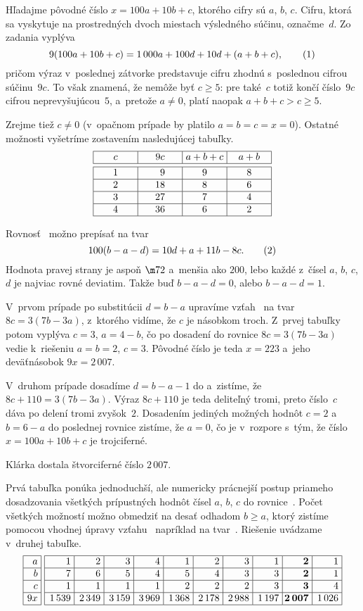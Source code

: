 {%
Hľadajme pôvodné číslo $x=100a+10b+c$, ktorého cifry sú $a$, $b$, $c$.
Cifru, ktorá sa vyskytuje na prostredných dvoch miestach výsledného súčinu,
označme~$d$. Zo zadania vyplýva
$$
9(100a+10b+c)=1\,000a+100d+10d+(a+b+c),    \tag1
$$
pričom výraz v~poslednej zátvorke predstavuje cifru zhodnú s~poslednou
cifrou súčinu~$9c$. To však znamená, že nemôže byť $c\ge5$: pre také~$c$
totiž končí číslo~$9c$ cifrou neprevyšujúcou~$5$, a~pretože $a\ne0$, platí
naopak $a+b+c>c\ge5$.

Zrejme tiež $c\ne0$ (v~opačnom prípade by platilo $a=b=c=x=0$). Ostatné
možnosti vyšetríme zostavením nasledujúcej tabuľky.
$$
\vbox{\offinterlineskip\everycr{\noalign{\hrule}}
 \catcode`@\active\def@{\phantom0}
 \halign{\strut\vrule#&&\hbox to 4.5em{\hss$#$\hss}\vrule\cr
&c   &9c &a+b+c& a+b\cr \noalign{\vskip3pt\hrule}
&1   &@9 & 9   &8\cr
&2   &18 & 8   &6\cr
&3   &27 & 7   &4\cr
&4   &36 & 6   &2\cr
}}
$$

Rovnosť~ možno prepísať na tvar
$$
100(b-a-d)=10d+a+11b-8c.          \tag2
$$
Hodnota pravej strany je aspoň $\m72$ a~menšia ako $200$, lebo každé z~čísel $a$,
$b$, $c$, $d$ je najviac rovné deviatim. Takže buď $b-a-d=0$, alebo $b-a-d=1$.

V~prvom prípade po substitúcii $d=b-a$ upravíme vzťah~ na tvar $8c=3(7b-3a)$,
z~ktorého vidíme, že $c$ je násobkom troch. Z~prvej tabuľky potom vyplýva $c=3$, $a=4-b$,
čo po dosadení do rovnice $8c=3(7b-3a)$ vedie k~riešeniu $a=b=2$, $c=3$.
Pôvodné číslo je teda $x=223$ a~jeho deväťnásobok $9x=2\,007$.

V~druhom prípade dosadíme $d=b-a-1$ do  a~zistíme, že $8c+110=3(7b-3a)$.
Výraz $8c+110$ je teda deliteľný tromi, preto číslo~$c$ dáva po delení
tromi zvyšok~$2$. Dosadením jediných možných hodnôt $c=2$ a~$b=6-a$ do poslednej
rovnice zistíme, že $a=0$, čo je v~rozpore s~tým, že číslo $x=100a+10b+c$ je
trojciferné.

\zaver
Klárka dostala štvorciferné číslo $2\,007$.

\poznamka
Prvá tabuľka ponúka jednoduchší, ale numericky prácnejší postup priameho dosadzovania
všetkých prípustných hodnôt čísel $a$, $b$, $c$ do rovnice~. Počet všetkých
možností možno obmedziť na desať odhadom $b\ge a$, ktorý zistíme pomocou vhodnej
úpravy vzťahu~ napríklad na tvar~. Riešenie uvádzame v~druhej tabuľke.
$$
\vbox{%
 \catcode`@\active\def@#1{\text{\bf #1}}
 \everycr{\noalign{\vrule}}\dimen1=1.8em
 \centerline{\valign{\hrule#&&\hbox to\dimen1{ \strut\hss$#$ }\hrule\cr
 &a  &b  &c  &9x\cr   \noalign{\global\dimen1=3em \hskip3pt\vrule}
 &1  &7  &1  &1\,539\cr
 &2  &6  &1  &2\,349\cr
 &3  &5  &1  &3\,159\cr
 &4  &4  &1  &3\,969\cr
 &1  &5  &2  &1\,368\cr
 &2  &4  &2  &2\,178\cr
 &3  &3  &2  &2\,988\cr
 &1  &3  &3  &1\,197\cr
&@2 &@2 &@3 &@{2\,007}\cr
 &1  &1  &4  &1\,026\cr}}}
$$


}
